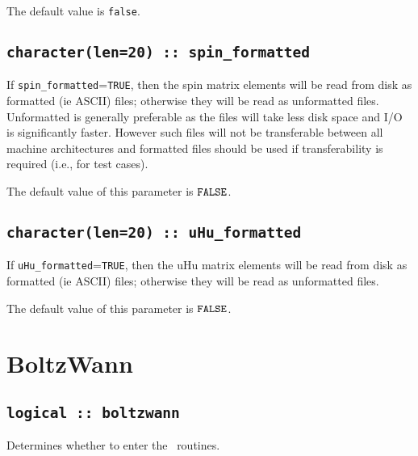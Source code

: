 The default value is \verb#false#.



\subsection[spin\_formated]{\tt character(len=20) :: spin\_formatted}

If \verb#spin_formatted#=\verb#TRUE#, then the spin matrix elements will be
read from disk as formatted (ie ASCII) files; otherwise they will be
read as unformatted files. Unformatted is generally preferable as the
files will take less disk space and I/O is significantly
faster. However such files will not be transferable between all
machine architectures and formatted files should be used if
transferability is required (i.e., for test cases).

The default value of this parameter is $\verb#FALSE#$.

\subsection[uHu\_formated]{\tt character(len=20) :: uHu\_formatted}

If \verb#uHu_formatted#=\verb#TRUE#, then the uHu matrix elements will be
read from disk as formatted (ie ASCII) files; otherwise they will be
read as unformatted files.

The default value of this parameter is $\verb#FALSE#$.







\clearpage
\section{BoltzWann}
\subsection[boltzwann]{\tt logical :: boltzwann}
Determines whether to enter the \bw\ routines.

